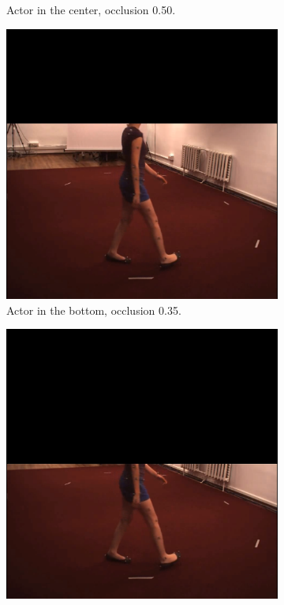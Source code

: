 \documentclass[runningheads]{llncs}
\begin{document}
\begin{figure}
\begin{subfigure}[t]{0.24\textwidth}
    \caption{Actor in the center, occlusion 0.50.}
    \label{fig: actor center, occlusion ratio 50}
  \end{subfigure}
  \begin{subfigure}[t]{0.24\textwidth}
    \centering
    \includegraphics[width=\textwidth]{assets/h35_S1_Walking 1.54138969.png}
    \caption{Actor in the bottom, occlusion 0.35.}
    \label{fig: actor bottom, occlusion ratio 35}
  \end{subfigure}
  \begin{subfigure}[t]{0.24\textwidth}
    \centering
    \includegraphics[width=\textwidth]{assets/h50_S1_Walking 1.54138969.png}

\end{subfigure}
\end{figure}
\end{document}
